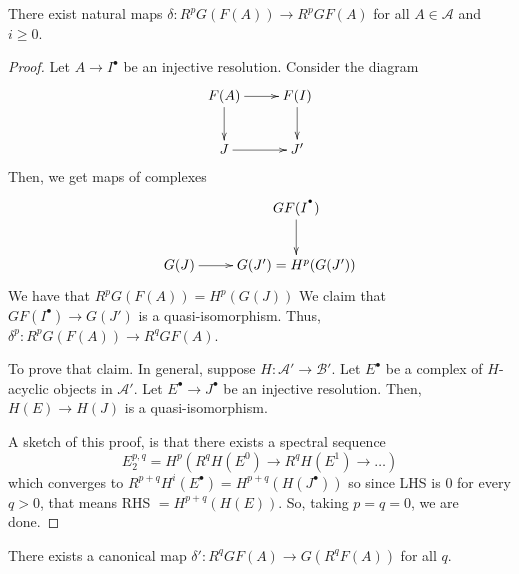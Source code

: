 \documentclass[12pt]{scrartcl}
\begin{document}
\begin{proposition}
There exist natural maps $\delta: R^pG(F(A)) \to R^pGF(A)$ for all $A \in \mathscr{A}$ and $i \geq 0$.
\end{proposition}
\begin{proof}
	Let $A \to I^{\bullet}$ be an injective resolution.
	Consider the diagram
	\[
	\xymatrix{
	F(A) \ar[r] \ar[d] & F(I) \ar[d] \\
	J \ar[r] & J' \\
	}
	\]
	Then, we get maps of complexes
	\[
	\xymatrix{
	& GF(I^{^\bullet}) \ar[d] \\
		G(J) \ar[r] & G(J') = H^p(G(J'))
	}
	\]
	We have that $R^pG(F(A)) = H^p(G(J))$ 
	We claim that $GF(I^{\bullet}) \to G(J')$ is a quasi-isomorphism.
	Thus, $\delta^p: R^pG(F(A)) \to R^q GF(A)$. 

	To prove that claim.
	In general, suppose $H: \mathscr{A}' \to \mathscr{B}'$.
	Let $E^{\bullet}$ be a complex of $H$-acyclic objects in $\mathscr{A}'$.
	Let $E^{\bullet}\to J^{\bullet}$ be an injective resolution.
	Then, $H(E) \to H(J)$ is a quasi-isomorphism.

	A sketch of this proof, is that there exists a spectral sequence \[E_2^{p, q} = H^p \left(R^qH(E^0) \to R^qH(E^1) \to \dots\right)\]
	which converges to $R^{p+q}H^i(E^{\bullet}) = H^{p+q}(H(J^{\bullet}))$ so since LHS is $0$ for every $q>0$, that means RHS $= H^{p+q}(H(E))$.
	So, taking $p=q=0$, we are done. 
\end{proof}
\begin{prop}
There exists a canonical map $\delta': R^qGF(A) \to G(R^qF(A))$ for all $q$. 
\end{prop}
\end{document}
